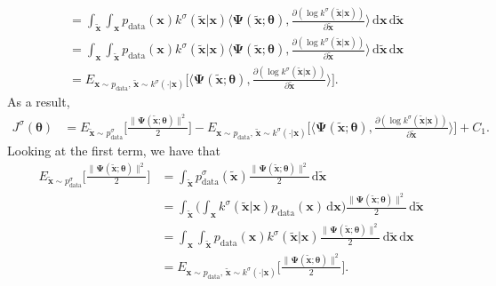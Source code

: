 \documentclass[10pt]{article}
\newcommand{\dee}{\mathrm{d}}
\newcommand{\ve}[1]{\mathbf{#1}}
\newcommand{\mrm}[1]{\mathrm{#1}}
\newcommand{\ves}[1]{\boldsymbol{#1}}
\begin{document}
\begin{itemize}
\begin{align*}
    &= \int_{\widetilde{\ve{x}}} \int_{\ve{x}} p_{\mrm{data}}(\ve{x}) k^\sigma(\widetilde{\ve{x}}|\ve{x}) \bigg\langle \ves{\Psi}(\widetilde{\ve{x}};\ves{\theta}),  \frac{\partial (\log k^\sigma(\widetilde{\ve{x}}|\ve{x})) }{\partial \widetilde{\ve{x}}} \bigg\rangle\, \dee\ve{x}\,\dee\widetilde{\ve{x}} \\
    &= \int_{\ve{x}} \int_{\widetilde{\ve{x}}} p_{\mrm{data}}(\ve{x}) k^\sigma(\widetilde{\ve{x}}|\ve{x}) \bigg\langle \ves{\Psi}(\widetilde{\ve{x}};\ves{\theta}),  \frac{\partial (\log k^\sigma(\widetilde{\ve{x}}|\ve{x})) }{\partial \widetilde{\ve{x}}} \bigg\rangle\,\dee\widetilde{\ve{x}}\, \dee\ve{x} \\
    &= E_{\ve{x}\sim p_{\mrm{data}},\, \widetilde{\ve{x}} \sim k^\sigma(\cdot|\ve{x})}\bigg[ \bigg\langle \ves{\Psi}(\widetilde{\ve{x}};\ves{\theta}),  \frac{\partial (\log k^\sigma(\widetilde{\ve{x}}|\ve{x})) }{\partial \widetilde{\ve{x}}} \bigg\rangle \bigg].
  \end{align*}
  As a result,
  \begin{align*}
    J^\sigma(\ves{\theta}) 
    &= 
    E_{\widetilde{\ve{x}} \sim p^\sigma_{\mrm{data}}}\bigg[ \frac{\| \ves{\Psi}(\widetilde{\ve{x}};\ves{\theta}) \|^2}{2} \bigg]
    - E_{\ve{x}\sim p_{\mrm{data}},\, \widetilde{\ve{x}} \sim k^\sigma(\cdot|\ve{x})}\bigg[ \bigg\langle \ves{\Psi}(\widetilde{\ve{x}};\ves{\theta}),  \frac{\partial (\log k^\sigma(\widetilde{\ve{x}}|\ve{x})) }{\partial \widetilde{\ve{x}}} \bigg\rangle \bigg]
    + C_1.
  \end{align*}
  Looking at the first term, we have that
  \begin{align*}
    E_{\widetilde{\ve{x}} \sim p^\sigma_{\mrm{data}}}\bigg[ \frac{\| \ves{\Psi}(\widetilde{\ve{x}};\ves{\theta}) \|^2}{2} \bigg]
    &= \int_{\widetilde{\ve{x}}} p^\sigma_{\mrm{data}}(\widetilde{\ve{x}})\frac{\| \ves{\Psi}(\widetilde{\ve{x}};\ves{\theta}) \|^2}{2} \, \dee\widetilde{\ve{x}}\\ 
    &= \int_{\widetilde{\ve{x}}} \bigg( \int_{\ve{x}} k^\sigma(\widetilde{\ve{x}}|\ve{x})p_{\mrm{data}}(\ve{x})\, \dee\ve{x}\bigg) \frac{\| \ves{\Psi}(\widetilde{\ve{x}};\ves{\theta}) \|^2}{2} \, \dee\widetilde{\ve{x}} \\
    &= \int_{\ve{x}} \int_{\widetilde{\ve{x}}} p_{\mrm{data}}(\ve{x}) k^\sigma(\widetilde{\ve{x}}|\ve{x}) \frac{\| \ves{\Psi}(\widetilde{\ve{x}};\ves{\theta}) \|^2}{2} \, \dee\widetilde{\ve{x}}\, \dee\ve{x} \\
    &= E_{\ve{x}\sim p_{\mrm{data}},\, \widetilde{\ve{x}} \sim k^\sigma(\cdot|\ve{x})}\bigg[ \frac{\| \ves{\Psi}(\widetilde{\ve{x}};\ves{\theta}) \|^2}{2} \bigg].

\end{align*}
\end{itemize}
\end{document}
